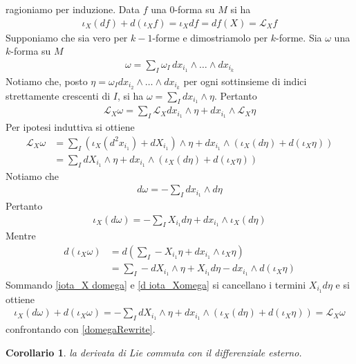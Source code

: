 \documentclass[oneside, 11pt]{amsbook}
\makeatletter
\newcommand{\0}{{(0)}}
\newcommand{\3}{{(3)}}
\theoremstyle{colonplain}
\newtheorem{cor}[thm]{Corollario}
\theoremstyle{colondefinition}
\theoremstyle{colonremark}
\numberwithin{equation}{chapter}
\renewcommand{\proofname}{Dimostrazione}
\renewenvironment{proof}[1][\proofname]{\par
  \pushQED{\qed}%
  \normalfont \topsep6\p@\@plus6\p@\relax
  \trivlist
  \item[\hskip\labelsep\bfseries #1:]\ignorespaces
}{%
  \popQED\endtrivlist\@endpefalse
}
\makeatother
\begin{document}
\begin{proof} ragioniamo per induzione. Data $f$ una $0$-forma su $M$ si ha
\begin{align}
    \iota_X(df) + d(\iota_X f) = \iota_X df = df(X) = \mathcal{L}_X f
\end{align}
Supponiamo che sia vero per $k - 1$-forme e dimostriamolo per $k$-forme. Sia $\omega$ una $k$-forma su $M$
\begin{align}
    \omega = \sum_I \omega_I \, dx_{i_1} \wedge \dots \wedge dx_{i_k} 
\end{align}
Notiamo che, posto $\eta = \omega_I dx_{i_2} \wedge \dots \wedge dx_{i_k}$ per ogni sottinsieme di indici strettamente crescenti di $I$, si ha $\omega = \sum_I dx_{i_1} \wedge \eta$. Pertanto
\begin{align}
    \mathcal{L}_X \omega = \sum_I \mathcal{L}_X dx_{i_1} \wedge \eta + dx_{i_1} \wedge \mathcal{L}_X \eta
\end{align}
Per ipotesi induttiva si ottiene
\begin{align}
    \mathcal{L}_X \omega &= \sum_I (\iota_X(d^2x_{i_1}) + dX_{i_1}) \wedge \eta + dx_{i_1} \wedge (\iota_X(d\eta) + d(\iota_X \eta)) \\
    &= \sum_I dX_{i_1} \wedge \eta + dx_{i_1} \wedge (\iota_X(d\eta) + d(\iota_X\eta))
\end{align}
Notiamo che
\begin{align}\label{domegaRewrite}
    d\omega = -\sum_I dx_{i_1} \wedge d\eta
\end{align}
Pertanto
\begin{align}\label{iota_X domega}
    \iota_X(d\omega) = -\sum_I X_{i_1}d\eta + dx_{i_1} \wedge \iota_X(d\eta)
\end{align}
Mentre
\begin{align}\label{d iota_Xomega}
    d(\iota_X \omega) &= d\left(\sum_I -X_{i_1}\eta + dx_{i_1} \wedge \iota_X\eta\right) \\
    &= \sum_I -dX_{i_1} \wedge \eta + X_{i_1}d\eta - dx_{i_1} \wedge d(\iota_X \eta)
\end{align}
Sommando \eqref{iota_X domega} e \eqref{d iota_Xomega} si cancellano i termini $X_{i_1}d\eta$ e si ottiene
\begin{align}
    \iota_X(d\omega) + d(\iota_X\omega) = -\sum_I dX_{i_1} \wedge \eta + dx_{i_1} \wedge (\iota_X(d\eta) + d(\iota_X\eta)) = \mathcal{L}_X\omega
\end{align}
confrontando con \eqref{domegaRewrite}.
\end{proof}
\begin{cor} la derivata di Lie commuta con il differenziale esterno.
\end{cor}
\end{document}
